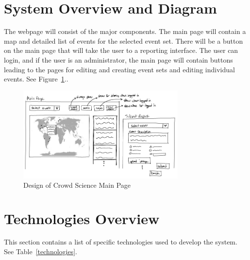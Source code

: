 \section{System Overview and Diagram}
The webpage will consist of the major components. The main page will contain a map and detailed list of events for the selected event set. There will be a button on the main page that will take the user to a reporting interface. The user can login, and if the user is an administrator, the main page will contain buttons leading to the pages for editing and creating event sets and editing individual events. See Figure~\ref{mainpage}..

\begin{figure}[tbh]
\begin{center}
\includegraphics[width=0.75\textwidth]{./Images/crowdscience_mainpagesketch.png}
\end{center}
\caption{Design of Crowd Science Main Page\label{mainpage}}
\end{figure}

\section{Technologies Overview}
This section contains a list of specific technologies used to
develop the system.  See Table~\ref{technologies}.  


